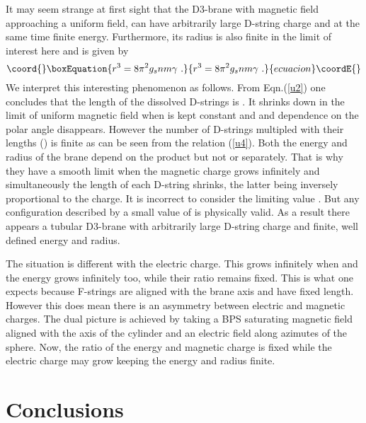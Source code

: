 \documentclass[a4paper,12pt]{article}
\begin{document}
It may seem strange at first sight that the D3-brane with magnetic field approaching a uniform field, can have arbitrarily large D-string charge and at the same time finite energy. Furthermore, its radius is also finite in the limit of interest here and is given by
\begin{equation}\coord{}\boxEquation{
r^3=8\pi^2g_snm\gamma\ .
\label{u5}
}{
r^3=8\pi^2g_snm\gamma\ .
}{ecuacion}\coordE{}\end{equation}
We interpret this interesting phenomenon as follows. From Eqn.(\ref{u2}) one concludes that the length of the dissolved D-strings is \coordHE{}. It shrinks down in the limit of uniform magnetic field when \coordHE{} is kept constant and and dependence on the polar angle disappears. However the number of D-strings multipled with their lengths (\coordHE{}) is finite as can be seen from the relation (\ref{u4}). Both the energy and radius of the brane depend on the product \coordHE{} but not \coordHE{} or \myHighlight{$\gamma$}\coordHE{} separately. That is why they have a smooth limit when the magnetic charge grows infinitely and simultaneously the length of each D-string shrinks, the latter being inversely proportional to the charge. It is incorrect to consider the limiting value \coordHE{}. But any configuration described by a small value of \myHighlight{$\gamma$}\coordHE{} is physically valid. As a result there appears a tubular D3-brane with arbitrarily large D-string charge and finite, well defined energy and radius.


The situation is different with the electric charge. This grows infinitely when \coordHE{} and the energy grows infinitely too, while their ratio remains fixed. This is what one expects because F-strings are aligned with the brane axis and have fixed length. However this does mean there is an asymmetry between electric and magnetic charges. The dual picture is achieved by taking a BPS saturating magnetic field aligned with the axis of the cylinder and an electric field along azimutes of the sphere. Now, the ratio of the energy and magnetic charge is fixed while the electric charge may grow keeping the energy and radius finite.

\section{Conclusions}
\end{document}
